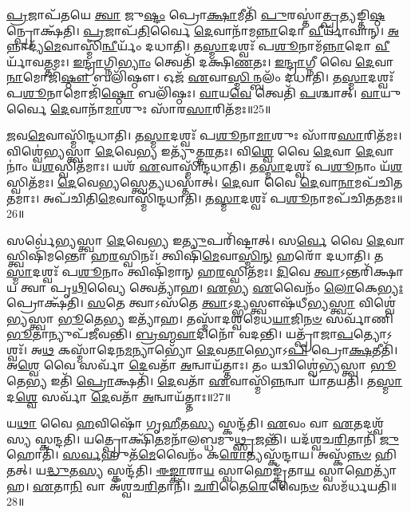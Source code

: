 \-\ul{𑌪𑍍𑌰}\-𑌜𑌾𑌪᳴𑌤𑌯𑍇 \ul{𑌤𑍍𑌵𑌾} 𑌜𑍁\-\ul{𑌷𑍍𑌟𑌂} 𑌪𑍍𑌰𑍋\-\ul{𑌕𑍍𑌷𑌾}\-𑌮𑍀𑌤𑌿᳴ \ul{𑌪𑍁}\-𑌰𑌸𑍍𑌤𑌾॑\-\ul{𑌤𑍍𑌪𑍍𑌰}\-𑌤𑍍𑌯𑌙𑍍𑌤𑌿\-\ul{𑌷𑍍𑌠}\-𑌨𑍍𑌪𑍍𑌰𑍋𑌕𑍍𑌷᳴𑌤𑌿।
\-\ul{𑌪𑍍𑌰}\-𑌜𑌾𑌪᳴\-\ul{𑌤𑌿}\-𑌰𑍍𑌵𑍈 \ul{𑌦𑍇}\-𑌵𑌾𑌨𑌾᳴𑌮\-\ul{𑌨𑍍𑌨𑌾}\-𑌦𑍋 \ul{𑌵𑍀}\-𑌰𑍍𑌯𑌾᳴𑌵𑌾𑌨𑍍।
\-\ul{𑌅}\-𑌨𑍍𑌨𑌾𑌦𑍍𑌯᳴\-\ul{𑌮𑍇}\-𑌵𑌾𑌸𑍍𑌮𑌿᳴\-\ul{𑌨𑍍𑌵𑍀}\-𑌰𑍍𑌯𑌂᳴ 𑌦𑌧𑌾𑌤𑌿।
𑌤\-\ul{𑌸𑍍𑌮𑌾}\-𑌦𑌶𑍍𑌵𑌃᳴ 𑌪\-\ul{𑌶𑍂}\-𑌨𑌾𑌮᳴\-\ul{𑌨𑍍𑌨𑌾}\-𑌦𑍋 \ul{𑌵𑍀}\-𑌰𑍍𑌯𑌾᳴𑌵𑌤𑍍𑌤𑌮𑌃।
\-\ul{𑌇}\-\-\ul{𑌨𑍍𑌦𑍍𑌰𑌾}\-𑌗𑍍𑌨𑌿\-\ul{𑌭𑍍𑌯𑌾𑌂} 𑌤𑍍𑌵𑍇𑌤𑌿᳴ 𑌦𑌕𑍍𑌷𑌿\-\ul{𑌣}\-𑌤𑌃।
\-\ul{𑌇}\-\-\ul{𑌨𑍍𑌦𑍍𑌰𑌾}\-𑌗𑍍𑌨𑍀 𑌵𑍈 \ul{𑌦𑍇}\-𑌵𑌾\-\ul{𑌨𑌾}\-𑌮𑍋𑌜𑌿᳴\-\ul{𑌷𑍍𑌠𑍗} 𑌬𑌲𑌿᳴𑌷𑍍𑌠𑍗।
𑌓𑌜᳴ \ul{𑌏}\-𑌵𑌾\-\ul{𑌸𑍍𑌮𑌿}\-𑌨𑍍𑌬𑌲𑌂᳴ 𑌦𑌧𑌾𑌤𑌿।
𑌤\-\ul{𑌸𑍍𑌮𑌾}\-𑌦𑌶𑍍𑌵𑌃᳴ 𑌪\-\ul{𑌶𑍂}\-𑌨𑌾𑌮𑍋𑌜𑌿᳴\-\ul{𑌷𑍍𑌠𑍋} 𑌬𑌲𑌿᳴𑌷𑍍𑌠𑌃।
\-\ul{𑌵𑌾}\-𑌯\-\ul{𑌵𑍇} 𑌤𑍍𑌵𑍇𑌤𑌿᳴ \ul{𑌪}\-𑌶𑍍𑌚𑌾𑌤𑍍।
\-\ul{𑌵𑌾}\-𑌯𑍁𑌰𑍍𑌵𑍈 \ul{𑌦𑍇}\-𑌵𑌾𑌨𑌾᳴\-\ul{𑌮𑌾}\-𑌶𑍁𑌃 𑌸𑌾᳴𑌰\-\ul{𑌸𑌾}\-𑌰𑌿𑌤᳴𑌮𑌃॥25॥

\-\ul{𑌜}\-𑌵\-\ul{𑌮𑍇}\-𑌵𑌾𑌸𑍍𑌮𑌿᳴𑌨𑍍𑌦𑌧𑌾𑌤𑌿।
𑌤\-\ul{𑌸𑍍𑌮𑌾}\-𑌦𑌶𑍍𑌵𑌃᳴ 𑌪\-\ul{𑌶𑍂}\-𑌨𑌾\-\ul{𑌮𑌾}\-𑌶𑍁𑌃 𑌸𑌾᳴𑌰\-\ul{𑌸𑌾}\-𑌰𑌿𑌤᳴𑌮𑌃।
𑌵𑌿𑌶𑍍𑌵𑍇॑𑌭𑍍𑌯𑌸𑍍𑌤𑍍𑌵𑌾 \ul{𑌦𑍇}\-𑌵𑍇\-\ul{𑌭𑍍𑌯} 𑌇𑌤𑍍𑌯𑍁᳴𑌤𑍍𑌤\-\ul{𑌰}\-𑌤𑌃।
𑌵𑌿\-\ul{𑌶𑍍𑌵𑍇} 𑌵𑍈 \ul{𑌦𑍇}\-𑌵𑌾 \ul{𑌦𑍇}\-𑌵𑌾𑌨𑌾𑌂॑ 𑌯\-\ul{𑌶}\-𑌸𑍍𑌵𑌿𑌤᳴𑌮𑌾𑌃।
𑌯𑌶᳴ \ul{𑌏}\-𑌵𑌾𑌸𑍍𑌮𑌿᳴𑌨𑍍𑌦𑌧𑌾𑌤𑌿।
𑌤\-\ul{𑌸𑍍𑌮𑌾}\-𑌦𑌶𑍍𑌵𑌃᳴ 𑌪\-\ul{𑌶𑍂}\-𑌨𑌾𑌂 𑌯᳴\-\ul{𑌶}\-𑌸𑍍𑌵𑌿𑌤᳴𑌮𑌃।
\-\ul{𑌦𑍇}\-𑌵𑍇\-\ul{𑌭𑍍𑌯}\-𑌸𑍍𑌤𑍍𑌵𑍇\-\ul{𑌤𑍍𑌯}\-𑌧𑌸𑍍𑌤𑌾॑𑌤𑍍।
\-\ul{𑌦𑍇}\-𑌵𑌾 𑌵𑍈 \ul{𑌦𑍇}\-𑌵𑌾\-\ul{𑌨𑌾}\-𑌮𑌪᳴𑌚𑌿𑌤𑌤𑌮𑌾𑌃।
𑌅𑌪᳴𑌚𑌿𑌤𑌿\-\ul{𑌮𑍇}\-𑌵𑌾𑌸𑍍𑌮𑌿᳴𑌨𑍍𑌦𑌧𑌾𑌤𑌿।
𑌤\-\ul{𑌸𑍍𑌮𑌾}\-𑌦𑌶𑍍𑌵𑌃᳴ 𑌪\-\ul{𑌶𑍂}\-𑌨𑌾𑌮𑌪᳴𑌚𑌿𑌤𑌤𑌮𑌃॥26॥

𑌸𑌰𑍍𑌵𑍇॑𑌭𑍍𑌯𑌸𑍍𑌤𑍍𑌵𑌾 \ul{𑌦𑍇}\-𑌵𑍇\-\ul{𑌭𑍍𑌯} 𑌇\-\ul{𑌤𑍍𑌯𑍁}\-𑌪𑌰𑌿᳴𑌷𑍍𑌟𑌾𑌤𑍍।
𑌸\-\ul{𑌰𑍍𑌵𑍇} 𑌵𑍈 \ul{𑌦𑍇}\-𑌵𑌾𑌸𑍍𑌤𑍍𑌵𑌿𑌷𑌿᳴𑌮𑌨𑍍𑌤𑍋 𑌹\-\ul{𑌰}\-𑌸𑍍𑌵𑌿𑌨𑌃᳴।
𑌤𑍍𑌵𑌿𑌷𑌿᳴\-\ul{𑌮𑍇}\-𑌵𑌾\-\ul{𑌸𑍍𑌮𑌿}\-\-\ul{𑌨𑍍} 𑌹𑌰𑍋᳴ 𑌦𑌧𑌾𑌤𑌿।
𑌤\-\ul{𑌸𑍍𑌮𑌾}\-𑌦𑌶𑍍𑌵𑌃᳴ 𑌪\-\ul{𑌶𑍂}\-𑌨𑌾𑌂 𑌤𑍍𑌵𑌿𑌷𑌿᳴𑌮𑌾𑌨𑍍‌ 𑌹\-\ul{𑌰}\-𑌸𑍍𑌵𑌿𑌤᳴𑌮𑌃।
\-\ul{𑌦𑌿}\-𑌵𑍇 \ul{𑌤𑍍𑌵𑌾}\-\-𑌽𑌨𑍍𑌤𑌰𑌿᳴𑌕𑍍𑌷𑌾𑌯 𑌤𑍍𑌵𑌾 𑌪𑍃\-\ul{𑌥𑌿}\-𑌵𑍍𑌯𑍈 𑌤𑍍𑌵𑍇𑌤𑍍𑌯𑌾᳴𑌹।
\-\ul{𑌏}\-𑌭𑍍𑌯 \ul{𑌏}\-𑌵𑍈𑌨𑌂᳴ \ul{𑌲𑍋}\-𑌕𑍇\-\ul{𑌭𑍍𑌯𑌃} 𑌪𑍍𑌰𑍋𑌕𑍍𑌷᳴𑌤𑌿।
\-\ul{𑌸}\-𑌤𑍇 𑌤𑍍𑌵𑌾\-𑌽𑌸᳴𑌤𑍇 \ul{𑌤𑍍𑌵𑌾}\-\-𑌽𑌦𑍍𑌭𑍍𑌯𑌸𑍍𑌤𑍍𑌵𑍗𑌷᳴𑌧𑍀𑌭𑍍𑌯\-\ul{𑌸𑍍𑌤𑍍𑌵𑌾} 𑌵𑌿𑌶𑍍𑌵𑍇॑𑌭𑍍𑌯𑌸𑍍𑌤𑍍𑌵𑌾 \ul{𑌭𑍂}\-𑌤𑍇\-\ul{𑌭𑍍𑌯} 𑌇𑌤𑍍𑌯𑌾᳴𑌹।
𑌤𑌸𑍍𑌮𑌾᳴𑌦𑌶𑍍𑌵𑌮𑍇𑌧\-\ul{𑌯𑌾}\-𑌜𑌿\-\ul{𑌨}\-\-\ul{𑍞} 𑌸𑌰𑍍𑌵𑌾᳴𑌣𑌿 \ul{𑌭𑍂}\-𑌤𑌾𑌨𑍍𑌯𑍁𑌪᳴𑌜𑍀𑌵𑌨𑍍𑌤𑌿।
\-\ul{𑌬𑍍𑌰}\-\-\ul{𑌹𑍍𑌮}\-\-\ul{𑌵𑌾}\-𑌦𑌿𑌨𑍋᳴ 𑌵𑌦𑌨𑍍𑌤𑌿।
𑌯𑌤𑍍𑌪𑍍𑌰𑌾᳴𑌜𑌾\-\ul{𑌪}\-𑌤𑍍𑌯𑍋\-𑌽𑌶𑍍𑌵𑌃᳴।
𑌅\-\ul{𑌥} 𑌕𑌸𑍍𑌮𑌾᳴𑌦𑍇𑌨\-\ul{𑌮}\-𑌨𑍍𑌯𑌾𑌭𑍍𑌯𑍋᳴ \ul{𑌦𑍇}\-𑌵\-\ul{𑌤𑌾}\-𑌭𑍍𑌯𑍋𑌽\-\ul{𑌪𑌿} 𑌪𑍍𑌰𑍋\-\ul{𑌕𑍍𑌷}\-𑌤𑍀𑌤𑌿᳴।
𑌅\-\ul{𑌶𑍍𑌵𑍇} 𑌵𑍈 𑌸𑌰𑍍𑌵𑌾᳴ \ul{𑌦𑍇}\-𑌵𑌤𑌾᳴ \ul{𑌅}\-𑌨𑍍𑌵𑌾𑌯᳴𑌤𑍍𑌤𑌾𑌃।
𑌤𑌂 𑌯𑌦𑍍𑌵𑌿𑌶𑍍𑌵𑍇॑𑌭𑍍𑌯𑌸𑍍𑌤𑍍𑌵𑌾 \ul{𑌭𑍂}\-𑌤𑍇\-\ul{𑌭𑍍𑌯} 𑌇𑌤𑌿᳴ \ul{𑌪𑍍𑌰𑍋}\-𑌕𑍍𑌷𑌤𑌿᳴।
\-\ul{𑌦𑍇}\-𑌵𑌤𑌾᳴ \ul{𑌏}\-𑌵𑌾𑌸𑍍𑌮𑌿᳴\-\ul{𑌨𑍍𑌨}\-𑌨𑍍𑌵𑌾 𑌯𑌾᳴𑌤𑌯𑌤𑌿।
𑌤\-\ul{𑌸𑍍𑌮𑌾}\-𑌦\-\ul{𑌶𑍍𑌵𑍇} 𑌸𑌰𑍍𑌵𑌾᳴ \ul{𑌦𑍇}\-𑌵𑌤𑌾᳴ \ul{𑌅}\-𑌨𑍍𑌵𑌾𑌯᳴𑌤𑍍𑌤𑌾𑌃॥27॥\anuvakamend[\-\ul{𑌸𑌾}\-\-\ul{𑌰}\-\-\ul{𑌸𑌾}\-𑌰𑌿\-\ul{𑌤}\-𑌮𑍋\-𑌽𑌪᳴𑌚𑌿𑌤𑌤𑌮𑌃 𑌪𑍍𑌰𑌾𑌜𑌾\-\ul{𑌪}\-𑌤𑍍𑌯𑍋\-𑌽\-\ul{𑌶𑍍𑌵𑌃} 𑌪𑌞𑍍𑌚᳴ 𑌚]

𑌯\-\ul{𑌥𑌾} 𑌵𑍈 \ul{𑌹}\-𑌵𑌿𑌷𑍋᳴ 𑌗𑍃\-\ul{𑌹𑍀}\-𑌤\-\ul{𑌸𑍍𑌯} 𑌸𑍍𑌕𑌨𑍍𑌦᳴𑌤𑌿।
\-\ul{𑌏}\-𑌵𑌂 𑌵𑌾 \ul{𑌏}\-𑌤𑌦𑌶𑍍𑌵᳴𑌸𑍍𑌯 𑌸𑍍𑌕𑌨𑍍𑌦𑌤𑌿।
𑌯𑌤𑍍𑌪𑍍𑌰𑍋𑌕𑍍𑌷𑌿᳴\-\ul{𑌤}\-𑌮𑌨𑌾᳴𑌲𑌬𑍍𑌧𑌮𑍁\-\ul{𑌥𑍍𑌸𑍃}\-𑌜𑌨𑍍𑌤𑌿᳴।
𑌯𑌦᳴𑌶𑍍𑌵𑌚\-\ul{𑌰𑌿}\-𑌤𑌾𑌨𑌿᳴ \ul{𑌜𑍁}\-𑌹𑍋𑌤𑌿᳴।
\-\ul{𑌸}\-\-\ul{𑌰𑍍𑌵}\-𑌹𑍁𑌤᳴\-\ul{𑌮𑍇}\-𑌵𑍈𑌨𑌂᳴ 𑌕\-\ul{𑌰𑍋}\-𑌤𑍍𑌯𑌸𑍍𑌕᳴𑌨𑍍𑌦𑌾𑌯।
𑌅𑌸𑍍𑌕᳴\-\ul{𑌨𑍍𑌨}\-\-\ul{𑍞} 𑌹𑌿 𑌤𑌤𑍍।
𑌯\-\ul{𑌦𑍍𑌧𑍁}\-𑌤\-\ul{𑌸𑍍𑌯} 𑌸𑍍𑌕𑌨𑍍𑌦᳴𑌤𑌿।
\-\ul{𑌈}\-\-\ul{𑌙𑍍𑌕𑌾}\-𑌰𑌾\-\ul{𑌯} 𑌸𑍍𑌵𑌾𑌹𑍇𑌙𑍍𑌕𑍃᳴𑌤𑌾\-\ul{𑌯} 𑌸𑍍𑌵𑌾𑌹𑍇𑌤𑍍𑌯𑌾᳴𑌹।
\-\ul{𑌏}\-𑌤𑌾\-\ul{𑌨𑌿} 𑌵𑌾 𑌅᳴𑌶𑍍𑌵𑌚\-\ul{𑌰𑌿}\-𑌤𑌾𑌨𑌿᳴।
\-\ul{𑌚}\-\-\ul{𑌰𑌿}\-𑌤𑍈\-\ul{𑌰𑍇}\-𑌵𑍈\-\ul{𑌨}\-\-\ul{𑍞} 𑌸𑌮᳴𑌰𑍍𑌧𑌯𑌤𑌿॥28॥

